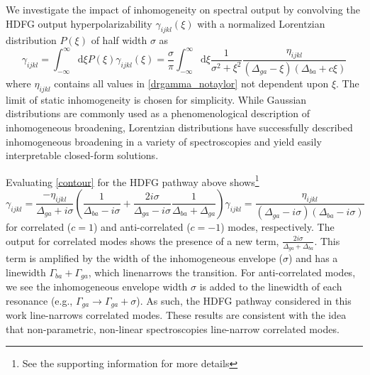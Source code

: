 \documentclass[aip, jcp, reprint, onecolumn, nofootinbib]{revtex4-2}
\begin{document}
We investigate the impact of inhomogeneity on spectral output by convolving the HDFG output hyperpolarizability $\gamma_{ijkl}(\xi)$ with a normalized Lorentzian distribution $P(\xi)$ of half width $\sigma$ as \cite{Desiderio1979, Dick83_1, Carlson1990line} 
\begin{equation}\label{contour}
	\gamma_{ijkl} = \int_{-\infty}^\infty \mathrm{d}\xi P(\xi) \gamma_{ijkl}(\xi)
	= \frac{\sigma}{\pi}\int_{-\infty}^\infty \mathrm{d}\xi \frac{1}{\sigma^2 + \xi^2} \frac{\eta_{ijkl}}{\left(\Delta_{ga} - \xi\right)\left(\Delta_{ba}+ c\xi\right)}
\end{equation} 
where $\eta_{ijkl}$ contains all values in \autoref{drgamma_notaylor} not dependent upon $\xi$.
The limit of static inhomogeneity is chosen for simplicity.
While Gaussian distributions are commonly used as a phenomenological description of inhomogeneous broadening, Lorentzian distributions have successfully described inhomogeneous broadening in a variety of spectroscopies and yield easily interpretable closed-form solutions. \cite{Desiderio1979, Dick83_1, Carlson1990line, RN410}

Evaluating \autoref{contour} for the HDFG pathway above shows\footnote{See the supporting information for more details} 
\begin{subequations}\label{linenarrow}
	\begin{equation}\label{linenarrowa}
		\gamma_{ijkl} = \frac{- \eta_{ijkl}}{\Delta_{ga}+ i \sigma} \left( \frac{1}{\Delta_{ba}-i \sigma} + \frac{2 i \sigma}{\Delta_{ga}-i \sigma} \frac{1}{\Delta_{ba} + \Delta_{ga}} \right)
	\end{equation}
	\begin{equation}
		\gamma_{ijkl} = \frac{\eta_{ijkl}}{\left(\Delta_{ga}-i\sigma \right) \left(\Delta_{ba}-i \sigma\right)}
	\end{equation}
\end{subequations}
for correlated ($c = 1$) and anti-correlated ($c = -1$) modes, respectively.
The output for correlated modes shows the presence of a new term, $\frac{2i\sigma}{\Delta_{ga} + \Delta_{ba}}$. 
This term is amplified by the width of the inhomogeneous envelope ($\sigma$) and has a linewidth $\Gamma_{ba} + \Gamma_{ga}$, which linenarrows the transition. 
For anti-correlated modes, we see the inhomogeneous envelope width $\sigma$ is added to the linewidth of each resonance (e.g., $\Gamma_{ga} \rightarrow \Gamma_{ga} + \sigma$).
As such, the HDFG pathway considered in this work line-narrows correlated modes. 
These results are consistent with the idea that non-parametric, non-linear spectroscopies line-narrow correlated modes. \cite{Dick83_1, Carlson1990line}
\end{document}
